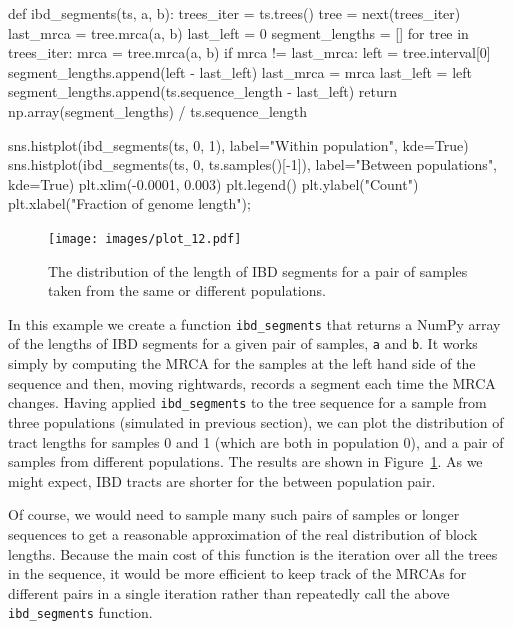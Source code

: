 \documentclass[graybox]{svmult}
\begin{document}
\begin{pythoncode}
def ibd_segments(ts, a, b):
    trees_iter = ts.trees()
    tree = next(trees_iter)
    last_mrca = tree.mrca(a, b)
    last_left = 0
    segment_lengths = []
    for tree in trees_iter:
        mrca = tree.mrca(a, b)
        if mrca != last_mrca:
            left = tree.interval[0]
            segment_lengths.append(left - last_left)
            last_mrca = mrca
            last_left = left
    segment_lengths.append(ts.sequence_length - last_left)
    return np.array(segment_lengths) / ts.sequence_length

sns.histplot(ibd_segments(ts, 0, 1),
    label="Within population", kde=True)
sns.histplot(ibd_segments(ts, 0, ts.samples()[-1]),
    label="Between populations", kde=True)
plt.xlim(-0.0001, 0.003)
plt.legend()
plt.ylabel("Count")
plt.xlabel("Fraction of genome length");
\end{pythoncode}

\begin{figure}
\begin{center}
\texttt{[image: images/plot\_12.pdf]}
\end{center}
\caption{\label{fig:ibd_segments} The distribution of the length of IBD
segments for a pair of samples taken from the same or different populations.}
\end{figure}

In this example we create a function \texttt{ibd\_segments} that returns
a NumPy array of the lengths of IBD segments for a given pair of
samples, \texttt{a} and \texttt{b}. It works simply by computing the
MRCA for the samples at the left hand side of the sequence and then,
moving rightwards, records a segment each time the MRCA changes. Having 
applied \texttt{ibd\_segments} to the tree sequence for a sample from three populations (simulated in previous section),
we can plot the distribution of tract lengths for samples 0 and 1 (which are
both in population 0), and a pair of
samples from different populations. The results are shown in
Figure~\ref{fig:ibd_segments}. As we might expect, IBD tracts
are shorter for the between population pair.

Of course, we would need to sample many such pairs of samples or longer sequences to
get a reasonable approximation of the real distribution of block lengths.
Because the main cost of this function is the iteration over all the
trees in the sequence, it would be more efficient to keep track of the MRCAs
for different pairs in a single iteration rather than repeatedly
call the above \texttt{ibd\_segments} function.
\end{document}
